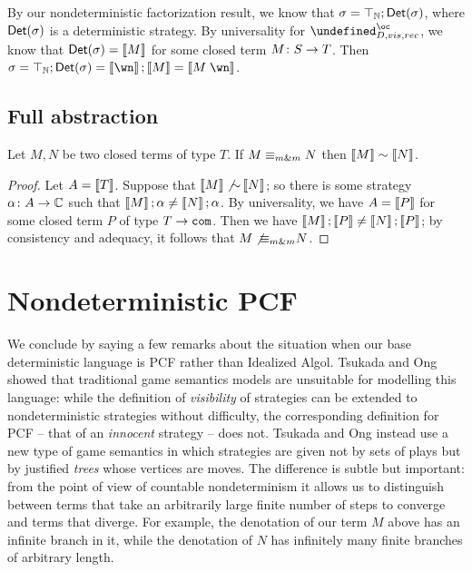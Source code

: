 \documentclass[sigplan,10pt,review]{acmart}\settopmatter{printfolios=true,printccs=false,printacmref=false}
\let\G\undefined
\begin{document}
By our nondeterministic factorization result, we know that $\sigma=\top_{\mathbb{N}};\mathsf{Det}(\sigma)$, where $\mathsf{Det}(\sigma)$ is a deterministic strategy.  
By universality for $\G_{D,vis,rec}^\oc$, we know that $\mathsf{Det}(\sigma)=\left\llbracket M\right\rrbracket$ for some closed term $M\colon S \to T$.  
Then $\sigma=\top_\bN;\Det(\sigma)=\deno{\wn};\deno M = \deno{M\;\wn}$.

\subsection{Full abstraction}

\begin{theorem}
  Let $M,N$ be two closed terms of type $T$.  
  If $M\equiv_{m\&m} N$ then $\left\llbracket M\right\rrbracket\sim\left\llbracket N\right\rrbracket$.  
\end{theorem}
\begin{proof}
  Let $A=\left\llbracket T\right\rrbracket$.  
  Suppose that $\left\llbracket M\right\rrbracket\not{\sim}\left\llbracket N\right\rrbracket$; so there is some strategy $\alpha\colon A\to\mathbb{C}$ such that $\left\llbracket M\right\rrbracket;\alpha\ne\left\llbracket N\right\rrbracket;\alpha$.  
  By universality, we have $A=\left\llbracket P\right\rrbracket$ for some closed term $P$ of type $T\to{\mathtt{com}}$.  
  Then we have $\left\llbracket M\right\rrbracket;\left\llbracket P\right\rrbracket\ne\left\llbracket N\right\rrbracket;\left\llbracket P\right\rrbracket$; by consistency and adequacy, it follows that $M\not{\equiv_{m\&m}} N$.
\end{proof}

\section{Nondeterministic PCF}

We conclude by saying a few remarks about the situation when our base deterministic language is PCF rather than Idealized Algol.  
Tsukada and Ong \cite{TsukadaSheaves} showed that traditional game semantics models are unsuitable for modelling this language: while the definition of \emph{visibility} of strategies can be extended to nondeterministic strategies without difficulty, the corresponding definition for PCF -- that of an \emph{innocent} strategy -- does not.  
Tsukada and Ong instead use a new type of game semantics in which strategies are given not by sets of plays but by justified \emph{trees} whose vertices are moves.  
The difference is subtle but important: from the point of view of countable nondeterminism it allows us to distinguish between terms that take an arbitrarily large finite number of steps to converge and terms that diverge.  
For example, the denotation of our term $M$ above has an infinite branch in it, while the denotation of $N$ has infinitely many finite branches of arbitrary length.  
\end{document}
